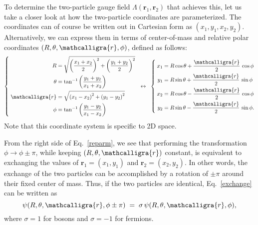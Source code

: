 \documentclass[pra,12pt]{revtex4}
\begin{document}
To determine the two-particle gauge field
$\Lambda(\mathbf{r}_1,\mathbf{r}_2)$ that achieves this, let us take a
closer look at how the two-particle coordinates are parameterized.
The coordinates can of course be written out in Cartesian form as
$(x_1, y_1, x_2, y_2)$.  Alternatively, we can express them in terms
of center-of-mass and relative polar coordinates $(R, \theta,
\mathcalligra{r}, \phi)$, defined as follows:
\begin{align}
  \left\{\;
  \begin{aligned}
  R &= \sqrt{\left(\frac{x_1+x_2}{2}\right)^2 + \left(\frac{y_1+y_2}{2}\right)^2} \\
  \theta &= \tan^{-1}\left(\frac{y_1+y_2}{x_1+x_2}\right) \\
  \mathcalligra{r} &= \sqrt{\left(x_1-x_2\right)^2 + \left(y_1-y_2\right)^2} \\
  \phi &= \tan^{-1}\left(\frac{y_1-y_2}{x_1-x_2}\right)
  \end{aligned}
  \right.
  \;\;\leftrightarrow\;\;
  \left\{ \;
  \begin{aligned}
    x_1 &= R \cos\theta + \frac{\mathcalligra{r}}{2} \,\cos\phi \\
    y_1 &= R \sin\theta + \frac{\mathcalligra{r}}{2} \,\sin\phi \\
    x_2 &= R \cos\theta - \frac{\mathcalligra{r}}{2} \,\cos\phi \\
    y_2 &= R \sin\theta - \frac{\mathcalligra{r}}{2} \,\sin\phi.
  \end{aligned}
  \right.
  \label{reparm}
\end{align}
Note that this coordinate system is specific to 2D space.

From the right side of Eq.~\eqref{reparm}, we see that performing the
transformation $\phi \rightarrow \phi \pm \pi$, while keeping $(R,
\theta, \mathcalligra{r})$ constant, is equivalent to exchanging the
values of $\mathbf{r}_1 = (x_1,y_1)$ and $\mathbf{r}_2 =(x_2,y_2)$.
In other words, the exchange of the two particles can be accomplished
by a rotation of $\pm \pi$ around their fixed center of mass.  Thus,
if the two particles are identical, Eq.~\eqref{exchange} can be
written as
\begin{equation}
  \psi(R, \theta, \mathcalligra{r}, \phi \pm \pi) \;=\;
  \sigma \, \psi(R, \theta, \mathcalligra{r}, \phi),
\end{equation}
where $\sigma = 1$ for bosons and $\sigma = -1$ for fermions.
\end{document}
